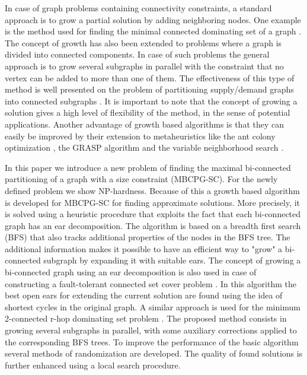 In case of graph problems containing connectivity constraints,  a standard approach is to grow a partial solution by adding neighboring nodes. One example is the method used for finding the minimal connected dominating set of a graph \citep{Raka2}. The concept  of growth has also been extended to problems where a graph is divided into connected components. In case of such problems the general approach is to grow several subgraphs in parallel  with the constraint that no vertex can be added to more than one of them. The effectiveness of this type of method  is  well presented on the problem of partitioning  supply/demand graphs into connected subgraphs \citep{BalancedGSD,MultiHeuristicGSD,Jovanovic2016317}. It is important to note that the concept of growing a solution gives a high level of flexibility of the method, in the sense of potential applications. Another advantage of growth based algorithms is that they can easily be improved by their extension to metaheuristics like  the ant colony optimization      \citep{dorigo2005ant}, the GRASP algorithm \citep{GRASP} and the variable neighborhood search \citep{hansen2010variable}. 


In this paper we introduce a new problem of finding the maximal bi-connected partitioning of a graph with a size constraint (MBCPG-SC). For the newly defined problem we show  NP-hardness. Because of this a growth based algorithm is developed for  MBCPG-SC for finding approximate solutions. More precisely, it is solved using a heuristic procedure that exploits the fact that each bi-connected graph has an ear decomposition. The algorithm is based on a breadth first search (BFS) that also tracks additional properties of the nodes in the BFS tree. The additional information makes it possible to have an efficient way to "grow" a bi-connected subgraph by expanding it with suitable ears. The concept of growing a bi-connected graph using an ear decomposition is also used in case of constructing a fault-tolerant connected set cover problem \citep{Zhang2009812}. In this algorithm the best open ears for extending the current solution are found using the idea of shortest cycles in the original graph. A similar approach is used for the  minimum 2-connected r-hop dominating set problem  \citep{li2010two}.  The proposed  method consists in  growing several subgraphs in parallel, with some auxiliary corrections applied to  the corresponding BFS trees. To improve the performance of the basic algorithm several methods of randomization are developed. The quality of found solutions is further enhanced using  a local search procedure. 

